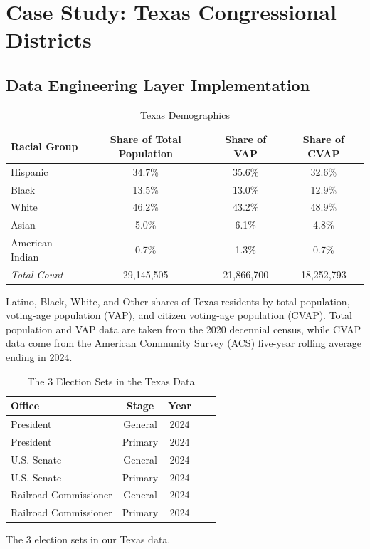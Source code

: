 \documentclass[sn-vancouver,Numbered]{sn-jnl}
\theoremstyle{thmstyleone}%
\theoremstyle{thmstyletwo}%
\theoremstyle{thmstylethree}%
\begin{document}
\section{Case Study: Texas Congressional Districts}
\subsection{Data Engineering Layer Implementation}

\begin{table}[ht]
\centering
\caption{Texas Demographics}
\begin{tabular}{lccc}
\hline
\textbf{Racial Group} & \textbf{Share of Total Population} & \textbf{Share of VAP} & \textbf{Share of CVAP} \\
\hline
Hispanic & 34.7\% & 35.6\% & 32.6\% \\
Black  & 13.5\% & 13.0\% & 12.9\% \\
White  & 46.2\% & 43.2\% & 48.9\% \\
Asian  & 5.0\%  & 6.1\%  & 4.8\% \\
American Indian  & 0.7\%  & 1.3\%  & 0.7\% \\
\hline
\textit{Total Count} &  29,145,505 &  21,866,700 &  18,252,793\\
\hline
\end{tabular}

\vspace{0.5em}
\footnotesize{
Latino, Black, White, and Other shares of Texas residents by total population, voting-age population (VAP), and citizen voting-age population (CVAP). 
Total population and VAP data are taken from the 2020 decennial census, while CVAP data come from the American Community Survey (ACS) five-year rolling average ending in 2024.
}
\end{table}

\begin{table}[ht]
\centering
\caption{The 3 Election Sets in the Texas Data}
\begin{tabular}{lcccc}
\toprule
Office & Stage & Year \\
\midrule
President & General & 2024 \\
President & Primary & 2024 \\
U.S. Senate & General & 2024 \\ 
U.S. Senate & Primary & 2024 \\
Railroad Commissioner & General & 2024 \\ 
Railroad Commissioner & Primary & 2024 \\

\bottomrule
\end{tabular}

\vspace{0.5em}
\begin{minipage}{0.9\textwidth}
\footnotesize
The 3 election sets in our Texas data.
\end{minipage}

\end{table}
\end{document}
